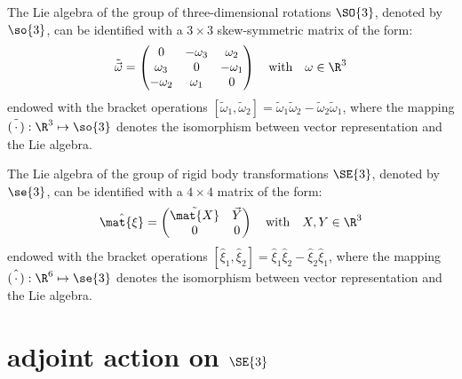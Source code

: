 \begin{definition}
The Lie algebra of the group of three-dimensional rotations $\SO{3}$, denoted by $\so{3}$, can be identified with a $3 \times 3$ skew-symmetric matrix of the form:
\begin{equation}
\tilde{\vec{\omega}} = 
\begin{pmatrix} 0 & -\omega_3 & \omega_2 \\ \omega_3 & 0 & -\omega_1 \\ -\omega_2 & \omega_1 & 0 \end{pmatrix} \quad \text{with} \quad \omega \in \R^3
\end{equation}
endowed with the bracket operations $[\tilde{\omega}_1,\tilde{\omega}_2] = \tilde{\omega}_1\tilde{\omega}_2 - \tilde{\omega}_2 \tilde{\omega}_1$, where the mapping $\tilde{(\,\cdot\,)}: \R^3 \mapsto \so{3}$ denotes the isomorphism between vector representation and the Lie algebra.
\end{definition}

\begin{definition}
The Lie algebra of the group of rigid body transformations $\SE{3}$, denoted by $\se{3}$, can be identified with a $4 \times 4$ matrix of the form:
\begin{equation}
\hat{\mat{\xi}} = 
\begin{pmatrix} \tilde{\mat{X}} & \vec{Y} \\ 0 & 0 \end{pmatrix} \quad \text{with} \quad X,Y \in \R^3
\end{equation}
endowed with the bracket operations $[\hat{\xi}_1,\hat{\xi}_2] = \hat{\xi}_1\hat{\xi}_2 - \hat{\xi}_2 \hat{\xi}_1$, where the mapping $\hat{(\,\cdot\,)}: \R^6 \mapsto \se{3}$ denotes the isomorphism between vector representation and the Lie algebra.

\end{definition}

\section{adjoint action on $\SE{3}$}

